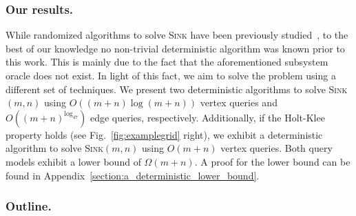 \documentclass[runningheads,a4paper]{llncs}
\newcommand{\sink}{\textsc{Sink}\xspace}
\newcommand{\sinkmn}{\textsc{Sink}$(m,n)$\xspace}
\begin{document}


\vspace{-.2in}\subsubsection{Our results.}
While randomized algorithms to solve \sink have been previously studied~\cite{grid05,linepoint,grid08,falkthesis}, 
to the best of our knowledge no non-trivial deterministic algorithm was known prior to this work. This is mainly due to the fact that the aforementioned subsystem oracle does not exist. In light of this fact, we aim to solve the problem using a different set of techniques.
We present two deterministic algorithms to solve \sinkmn using $O((m+n)\log (m+n))$ vertex queries
and $O((m+n)^{\log_47})$ edge queries, respectively. 
Additionally, if the Holt-Klee property holds (see Fig.~\ref{fig:examplegrid} right), we exhibit a deterministic algorithm to solve \sinkmn using $O(m + n)$ vertex queries. 
Both query models exhibit a lower bound of $\Omega(m + n)$. A proof for the lower bound can be found in Appendix~\ref{section:a_deterministic_lower_bound}.

\vspace{-.2in}\subsubsection{Outline.}
\end{document}

